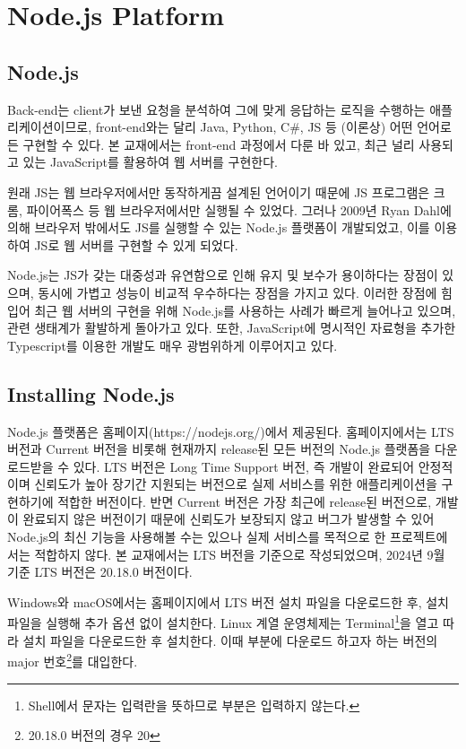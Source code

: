 \section{Node.js Platform}\label{sect:node-js}

\subsection*{Node.js}

Back-end는 client가 보낸 요청을 분석하여 그에 맞게 응답하는 로직을 수행하는 애플리케이션이므로, front-end와는 달리 Java, Python, C\#, JS 등 (이론상) 어떤 언어로든 구현할 수 있다. 본 교재에서는 front-end 과정에서 다룬 바 있고, 최근 널리 사용되고 있는 JavaScript를 활용하여 웹 서버를 구현한다.

원래 JS는 웹 브라우저에서만 동작하게끔 설계된 언어이기 때문에 JS 프로그램은 크롬, 파이어폭스 등 웹 브라우저에서만 실행될 수 있었다. 그러나 2009년 Ryan Dahl에 의해 브라우저 밖에서도 JS를 실행할 수 있는 Node.js 플랫폼이 개발되었고, 이를 이용하여 JS로 웹 서버를 구현할 수 있게 되었다.

Node.js는 JS가 갖는 대중성과 유연함으로 인해 유지 및 보수가 용이하다는 장점이 있으며, 동시에 가볍고 성능이 비교적 우수하다는 장점을 가지고 있다. 이러한 장점에 힘입어 최근 웹 서버의 구현을 위해 Node.js를 사용하는 사례가 빠르게 늘어나고 있으며, 관련 생태계가 활발하게 돌아가고 있다. 또한, JavaScript에 명시적인 자료형을 추가한 Typescript를 이용한 개발도 매우 광범위하게 이루어지고 있다.

\subsection*{Installing Node.js}

Node.js 플랫폼은 홈페이지(https://nodejs.org/)에서 제공된다. 홈페이지에서는 LTS 버전과 Current 버전을 비롯해 현재까지 release된 모든 버전의 Node.js 플랫폼을 다운로드받을 수 있다. LTS 버전은 Long Time Support 버전, 즉 개발이 완료되어 안정적이며 신뢰도가 높아 장기간 지원되는 버전으로 실제 서비스를 위한 애플리케이션을 구현하기에 적합한 버전이다. 반면 Current 버전은 가장 최근에 release된 버전으로, 개발이 완료되지 않은 버전이기 때문에 신뢰도가 보장되지 않고 버그가 발생할 수 있어 Node.js의 최신 기능을 사용해볼 수는 있으나 실제 서비스를 목적으로 한 프로젝트에서는 적합하지 않다. 본 교재에서는 LTS 버전을 기준으로 작성되었으며, 2024년 9월 기준 LTS 버전은 20.18.0 버전이다.

Windows와 macOS에서는 홈페이지에서 LTS 버전 설치 파일을 다운로드한 후, 설치 파일을 실행해 추가 옵션 없이 설치한다. Linux 계열 운영체제는 Terminal\footnote{Shell에서 \cd{\$} 문자는 입력란을 뜻하므로 \cd{\$ } 부분은 입력하지 않는다.}을 열고 \을 따라 설치 파일을 다운로드한 후 설치한다. 이때  부분에 다운로드 하고자 하는 버전의 major 번호\footnote{20.18.0 버전의 경우 20}를 대입한다.

